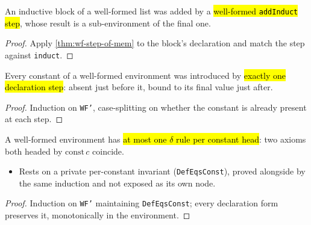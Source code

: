 \begin{lemma}
\label{thm:wf-induct-origin}
\leanok
{}

 An inductive block of a well-formed list was added by a \hl{well-formed
\texttt{addInduct} step}, whose result is a sub-environment of the final one.
\end{lemma}
\begin{proof}
\leanok
{} Apply \ref{thm:wf-step-of-mem} to the block's declaration and match the step
against \texttt{induct}.
\end{proof}

\begin{lemma}
\label{thm:wf-consts-origin}
\leanok
{}

 Every constant of a well-formed environment was introduced by \hl{exactly one
declaration step}: absent just before it, bound to its final value just after.
\end{lemma}
\begin{proof}
\leanok
{} Induction on \texttt{WF'}, case-splitting on whether the constant is already
present at each step.
\end{proof}

\begin{theorem}
\label{thm:wf-defeqs-const-uniq}
\leanok
{}

 A well-formed environment has \hl{at most one $\delta$ rule per constant
head}: two axioms both headed by $\mathrm{const}\,c$ coincide.
\begin{itemize}
\item {} Rests on a private per-constant invariant (\texttt{DefEqsConst}), proved
  alongside by the same induction and not exposed as its own node.
\end{itemize}
\end{theorem}
\begin{proof}
\leanok
{} Induction on \texttt{WF'} maintaining \texttt{DefEqsConst}; every declaration form
preserves it, monotonically in the environment.
\end{proof}

